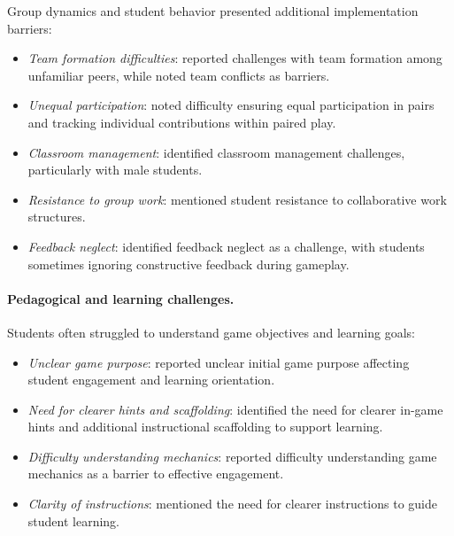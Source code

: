 \documentclass[a4paper,fleqn]{cas-sc}
\begin{document}

Group dynamics and student behavior presented additional implementation barriers:

\begin{itemize}[noitemsep]
 \item \textit{Team formation difficulties}: \citet{29Stiso20201165} reported challenges with team formation among unfamiliar peers, while \citet{75trajano2014using} noted team conflicts as barriers.
 
 \item \textit{Unequal participation}: \citet{11Ternblad2023115} noted difficulty ensuring equal participation in pairs and tracking individual contributions within paired play.
 
 \item \textit{Classroom management}: \citet{72hutauruk2020utilization} identified classroom management challenges, particularly with male students.
 
 \item \textit{Resistance to group work}: \citet{42Huffer201581} mentioned student resistance to collaborative work structures.
 
 \item \textit{Feedback neglect}: \citet{11Ternblad2023115} identified feedback neglect as a challenge, with students sometimes ignoring constructive feedback during gameplay.
\end{itemize}

\paragraph{Pedagogical and learning challenges.}


Students often struggled to understand game objectives and learning goals:

\begin{itemize}[noitemsep]
 \item \textit{Unclear game purpose}: \citet{52Lin2011265} reported unclear initial game purpose affecting student engagement and learning orientation.
 
 \item \textit{Need for clearer hints and scaffolding}: \citet{9Lin2018} identified the need for clearer in-game hints and additional instructional scaffolding to support learning.
 
 
 \item \textit{Difficulty understanding mechanics}: \citet{22Nugroho2020149} reported difficulty understanding game mechanics as a barrier to effective engagement.
 
 \item \textit{Clarity of instructions}: \citet{42Huffer201581} mentioned the need for clearer instructions to guide student learning.
\end{itemize}
\end{document}
